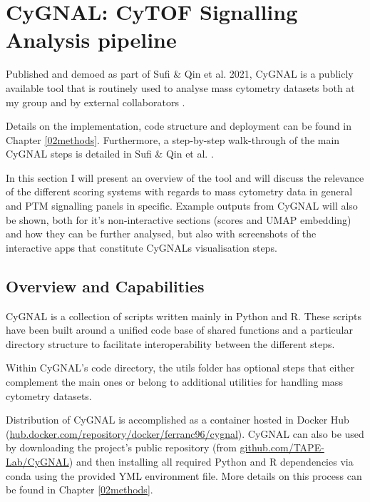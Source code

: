 \section{CyGNAL: CyTOF Signalling Analysis pipeline}

Published and demoed as part of Sufi \& Qin et al. 2021, CyGNAL is a publicly available tool that is routinely used to analyse mass cytometry datasets both at my group and by external collaborators \cite{michelozzi_activation_2023}.

Details on the implementation, code structure and deployment can be found in Chapter \ref{02methods}. Furthermore, a step-by-step walk-through of the main CyGNAL steps is detailed in Sufi \& Qin et al. \cite{sufi_multiplexed_2021}.

In this section I will present an overview of the tool and will discuss the relevance of the different scoring systems with regards to mass cytometry data in general and PTM signalling panels in specific. Example outputs from CyGNAL will also be shown, both for it's non-interactive sections (scores and UMAP embedding) and how they can be further analysed, but also with screenshots of the interactive apps that constitute CyGNALs visualisation steps.

\subsection{Overview and Capabilities}

CyGNAL is a collection of scripts written mainly in Python and R. These scripts have been built around a unified code base of shared functions and a particular directory structure to facilitate interoperability between the different steps. 

Within CyGNAL's code directory, the utils folder has optional steps that either complement the main ones or belong to additional utilities for handling mass cytometry datasets. 

Distribution of CyGNAL is accomplished as a container hosted in Docker Hub (\href{https://hub.docker.com/repository/docker/ferranc96/cygnal}{hub.docker.com/repository/docker/ferranc96/cygnal}). CyGNAL can also be used by downloading the project's public repository (from \href{github.com/TAPE-Lab/CyGNAL}{github.com/TAPE-Lab/CyGNAL}) and then installing all required Python and R dependencies via conda using the provided YML environment file. More details on this process can be found in Chapter \ref{02methods}.

